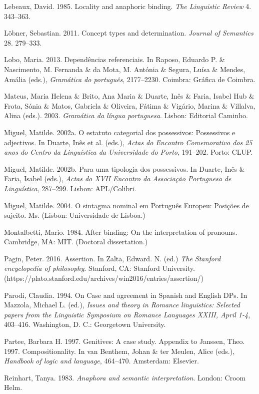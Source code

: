 \documentclass[output=paper]{langsci/langscibook}
\begin{document}
Lebeaux, David. 1985. Locality and anaphoric binding. \textit{The Linguistic Review} 4. 343–363.

Löbner, Sebastian. 2011. Concept types and determination. \textit{Journal of Semantics} 28. 279–333.

Lobo, Maria. 2013. Dependências referenciais. In Raposo, Eduardo P. \& Nascimento, M. Fernanda \& da Mota, M. Antónia \& Segura, Luísa \& Mendes, Amália (eds.), \textit{Gramática do português}, 2177–2230. Coimbra: Gráfica de Coimbra.

Mateus, Maria Helena \& Brito, Ana Maria \& Duarte, Inês \& Faria, Isabel Hub \& Frota, Sónia \& Matos, Gabriela \& Oliveira, Fátima \& Vigário, Marina \& Villalva, Alina (eds.). 2003. \textit{Gramática da língua portuguesa}. Lisbon: Editorial Caminho.

Miguel, Matilde. 2002a. O estatuto categorial dos possessivos: Possessivos e adjectivos. In Duarte, Inês et al. (eds.), \textit{Actas do Encontro Comemorativo dos 25 anos do Centro da Linguística da Universidade do Porto}, 191–202. Porto: CLUP.

Miguel, Matilde. 2002b. Para uma tipologia dos possessivos. In Duarte, Inês \& Faria, Isabel (eds.), \textit{Actas do XVII Encontro da Associação Portuguesa de Linguística}, 287–299. Lisbon: APL/Colibri.

Miguel, Matilde. 2004. O sintagma nominal em Português Europeu: Posições de sujeito. Ms. (Lisbon: Universidade de Lisboa.)

Montalbetti, Mario. 1984. After binding: On the interpretation of pronouns. Cambridge, MA: MIT. (Doctoral dissertation.)

Pagin, Peter. 2016. Assertion. In Zalta, Edward. N. (ed.) \textit{The Stanford encyclopedia of philosophy}. Stanford, CA: Stanford University. (https://plato.stanford.edu/archives/win2016/entries/assertion/)

Parodi, Claudia. 1994. On Case and agreement in Spanish and English DPs. In Mazzola, Michael L. (ed.), \textit{Issues and theory in Romance linguistics: Selected papers from the Linguistic Symposium on Romance Languages XXIII, April 1-4}, 403–416. Washington, D. C.: Georgetown University.

Partee, Barbara H. 1997. Genitives: A case study. Appendix to Janssen, Theo. 1997. Compositionality. In van Benthem, Johan \& ter Meulen, Alice (eds.), \textit{Handbook of logic and language}, 464–470. Amsterdam: Elsevier.

Reinhart, Tanya. 1983. \textit{Anaphora and semantic interpretation}. London: Croom Helm.
\end{document}
